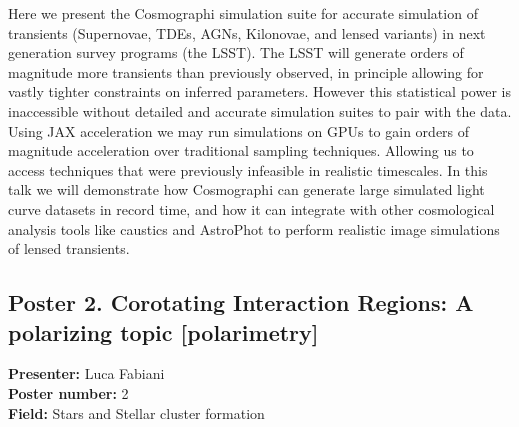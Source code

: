 Here we present the Cosmographi simulation suite for accurate simulation of transients (Supernovae, TDEs, AGNs, Kilonovae, and lensed variants) in next generation survey programs (the LSST). The LSST will generate orders of magnitude more transients than previously observed, in principle allowing for vastly tighter constraints on inferred parameters. However this statistical power is inaccessible without detailed and accurate simulation suites to pair with the data. Using JAX acceleration we may run simulations on GPUs to gain orders of magnitude acceleration over traditional sampling techniques. Allowing us to access techniques that were previously infeasible in realistic timescales. In this talk we will demonstrate how Cosmographi can generate large simulated light curve datasets in record time, and how it can integrate with other cosmological analysis tools like caustics and AstroPhot to perform realistic image simulations of lensed transients.

\hypertarget{poster-abstract-talk-285}{}\label{poster-abstract-page-talk-285}
\subsection*{Poster 2. Corotating Interaction Regions: A polarizing topic [polarimetry]}
\textbf{Presenter:} Luca Fabiani\\
\textbf{Poster number:} 2\\
\textbf{Field:} Stars and Stellar cluster formation

